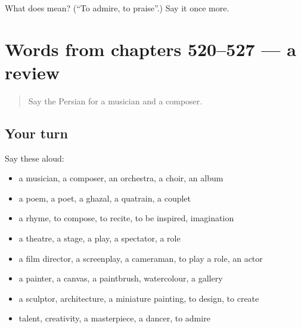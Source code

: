 \begin{tcolorbox}[breakable,colback=teal!4,colframe=teal!35!black,title={Before you move on}]
What does   mean? (\textquotedblleft{}To admire, to praise\textquotedblright{}.) Say it once more.
\end{tcolorbox}
\section[(dialogue)]{Words from chapters 520–527 — a review}

\label{lesson:FA-R527-review-520-527}



\begin{quote}
Say the Persian for a musician and a composer.
\end{quote}

\subsection*{Your turn}
Say these aloud:

\begin{itemize}
\raggedright
  \item a musician, a composer, an orchestra, a choir, an album
  \item a poem, a poet, a ghazal, a quatrain, a couplet
  \item a rhyme, to compose, to recite, to be inspired, imagination
  \item a theatre, a stage, a play, a spectator, a role
  \item a film director, a screenplay, a cameraman, to play a role, an actor
  \item a painter, a canvas, a paintbrush, watercolour, a gallery
  \item a sculptor, architecture, a miniature painting, to design, to create
  \item talent, creativity, a masterpiece, a dancer, to admire
\end{itemize}

